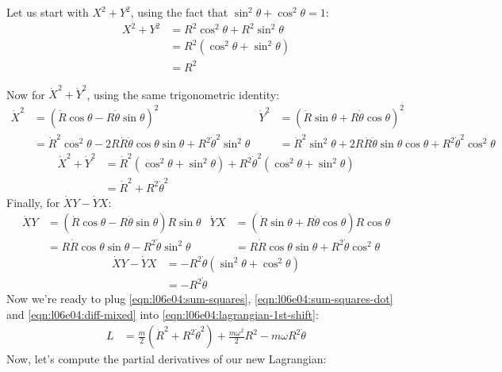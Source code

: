 \documentclass[solutions.tex]{subfiles}
\begin{document}
Let us start with $X^2+Y^2$, using the fact that
$\sin^2\theta+\cos^2\theta = 1$:
\begin{align}
	X^2+Y^2 &= R^2\cos^2\theta + R^2\sin^2\theta\nonumber\\
	~ &= R^2(\cos^2\theta + \sin^2\theta) \nonumber\\
	~ &= R^2
	\label{eqn:l06e04:sum-squares}
\end{align}

Now for $\dot{X}^2+\dot{Y}^2$, using the same trigonometric
identity:
\begin{align*}
	\dot{X}^2 &= (\dot{R}\cos\theta-R\dot\theta\sin\theta)^2 &
	\dot{Y}^2 &= (\dot{R}\sin\theta+R\dot\theta\cos\theta)^2\\
	~ &= \dot{R}^2\cos^2\theta
		-2R\dot{R}\dot\theta\cos\theta\sin\theta
		+R^2\dot\theta^2\sin^2\theta &
	~ & = \dot{R}^2\sin^2\theta
		+2R\dot{R}\dot\theta\sin\theta\cos\theta
		+R^2\dot\theta^2\cos^2\theta
\end{align*}
\begin{align}
	\dot{X}^2+\dot{Y}^2 &= \dot{R}^2(\cos^2\theta+\sin^2\theta)
		+R^2\dot\theta^2(\cos^2\theta+\sin^2\theta) \nonumber\\
	~ &= \dot{R}^2 + R^2\dot\theta^2
	\label{eqn:l06e04:sum-squares-dot}
\end{align}
Finally, for $\dot{X}Y-\dot{Y}X$:
\begin{align*}
	\dot{X}Y &= (\dot{R}\cos\theta-R\dot\theta\sin\theta)R\sin\theta &
	\dot{Y}X &= (\dot{R}\sin\theta+R\dot\theta\cos\theta)R\cos\theta \\
	~ &= R\dot{R}\cos\theta\sin\theta-R^2\dot\theta\sin^2\theta &
	~ &= R\dot{R}\cos\theta\sin\theta+R^2\dot\theta\cos^2\theta
\end{align*}
\begin{align}
	\dot{X}Y-\dot{Y}X &= -R^2\dot\theta(\sin^2\theta+\cos^2\theta)\nonumber\\
	~ &= -R^2\dot\theta
	\label{eqn:l06e04:diff-mixed}
\end{align}
Now we're ready to plug \eqref{eqn:l06e04:sum-squares},
\eqref{eqn:l06e04:sum-squares-dot} and \eqref{eqn:l06e04:diff-mixed}
into \eqref{eqn:l06e04:lagrangian-1st-shift}:
\begin{align}
	L &= \boxed{\frac{m}{2}(\dot{R}^2 +R^2\dot\theta^2)
		+\frac{m\omega^2}{2}R^2-m\omega R^2\dot\theta}
	\label{eqn:l06e04:lagrangian-2nd-shift}
\end{align}
Now, let's compute the partial derivatives of our new Lagrangian:
\end{document}
